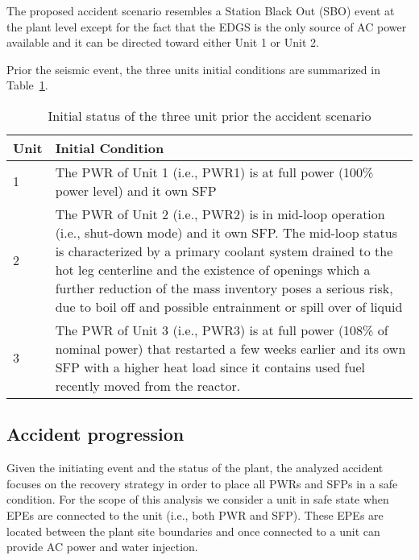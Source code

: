 The proposed accident scenario resembles a Station Black Out (SBO) event at the plant level except for the 
fact that the EDGS is the only source of AC power available and it can be directed toward either Unit 1 or Unit 2.

Prior the seismic event, the three units initial conditions are summarized in Table~\ref{tab:unitsStatus}.

\begin{table}
  \begin{tabular}{ | l | p{10cm} | }
    \hline      
      \textbf{Unit} & \textbf{Initial Condition} \\
      \hline \hline
      1 &       The PWR of Unit 1 (i.e., PWR1) is at full power (100\% power level) and it own SFP \\ \hline
      2 &       The PWR of Unit 2 (i.e., PWR2) is in mid-loop operation (i.e., shut-down mode) and it own SFP. 
                The mid-loop status is characterized by a primary coolant system drained to the 
                hot leg centerline and the existence of openings which a further reduction of 
                the mass inventory poses a serious risk, due to boil off and possible entrainment 
                or spill over of liquid\\ \hline
      3 &       The PWR of Unit 3 (i.e., PWR3) is at full power (108\% of nominal power) that restarted a few weeks 
                earlier and its own SFP with a higher heat load since it contains used fuel recently 
                moved from the reactor. \\
    \hline  
  \end{tabular}
  \caption{Initial status of the three unit prior the accident scenario}
  \label{tab:unitsStatus}
\end{table}

\subsection{Accident progression}
\label{sec:accidentProgression}

Given the initiating event and the status of the plant, the analyzed accident focuses on the recovery strategy 
in order to place all PWRs and SFPs in a safe condition. For the scope of this analysis we consider a unit in
safe state when EPEs are connected to the unit (i.e., both PWR and SFP). These EPEs 
are located between the plant site boundaries and once connected to a unit can provide AC power and water injection.

